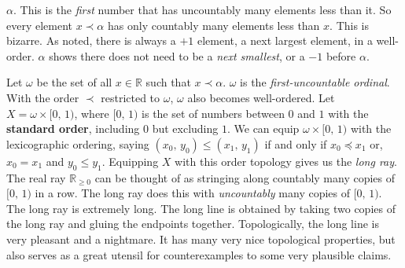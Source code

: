 \documentclass{article}
\theoremstyle{plain}
\theoremstyle{normal}
\begin{document}
        $\alpha$. This is the \textit{first} number that has uncountably many
        elements less than it. So every element $x\prec\alpha$ has only
        countably many elements less than $x$. This is bizarre. As noted,
        there is always a $+1$ element, a next largest element, in a well-order.
        $\alpha$ shows there does not need to be a \textit{next smallest}, or a
        $-1$ before $\alpha$.
        \par\hfill\par
        Let $\omega$ be the set of all $x\in\mathbb{R}$
        such that $x\prec\alpha$. $\omega$ is the
        \textit{first-uncountable ordinal}. With the order $\prec$ restricted
        to $\omega$, $\omega$ also becomes well-ordered. Let
        $X=\omega\times[0,\,1)$, where $[0,\,1)$ is the set of numbers between
        $0$ and $1$ with the \textbf{standard order}, including $0$ but
        excluding $1$. We can equip $\omega\times[0,\,1)$ with the
        lexicographic ordering, saying
        $(x_{0},\,y_{0})\leq(x_{1},\,y_{1})$ if and only if
        $x_{0}\preceq{x}_{1}$ or, $x_{0}=x_{1}$ and $y_{0}\leq{y}_{1}$.
        Equipping $X$ with this order topology gives us the
        \textit{long ray}. The real ray $\mathbb{R}_{\geq{0}}$ can be thought
        of as stringing along countably many copies of $[0,\,1)$ in a row.
        The long ray does this with \textit{uncountably} many copies of
        $[0,\,1)$. The long ray is extremely long. The long line is obtained by
        taking two copies of the long ray and gluing the endpoints together.
        Topologically, the long line is very pleasant and a nightmare. It has
        many very nice topological properties, but also serves as a great
        utensil for counterexamples to some very plausible claims.
\end{document}
